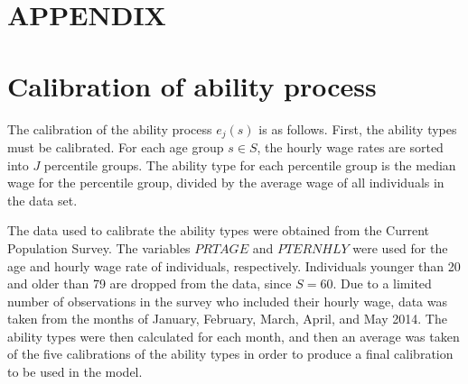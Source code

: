 \documentclass[letterpaper,12pt]{article}
\theoremstyle{definition}
\begin{document}
\begin{spacing}{1.5}


\clearpage
\end{spacing}

\newpage
\renewcommand{\theequation}{A.\arabic{section}.\arabic{equation}}
\renewcommand{\thesection}{A-\arabic{section}}   %
\setcounter{equation}{0}                         %
\setcounter{section}{0}                          %
\section*{APPENDIX}                              %

\section{Calibration of ability process}\label{AppAbilCalib}

  The calibration of the ability process $e_j(s)$ is as follows.  First, the ability types must be calibrated. For each age group $s \in S$, the hourly wage rates are sorted into $J$ percentile groups.  The ability type for each percentile group is the median wage for the percentile group, divided by the average wage of all individuals in the data set.  

  The data used to calibrate the ability types were obtained from the Current Population Survey. The variables $PRTAGE$ and $PTERNHLY$ were used for the age and hourly wage rate of individuals, respectively. Individuals younger than 20 and older than 79 are dropped from the data, since $S=60$. Due to a limited number of observations in the survey who included their hourly wage, data was taken from the months of January, February, March, April, and May 2014.  The ability types were then calculated for each month, and then an average was taken of the five calibrations of the ability types in order to produce a final calibration to be used in the model.
\end{document}
